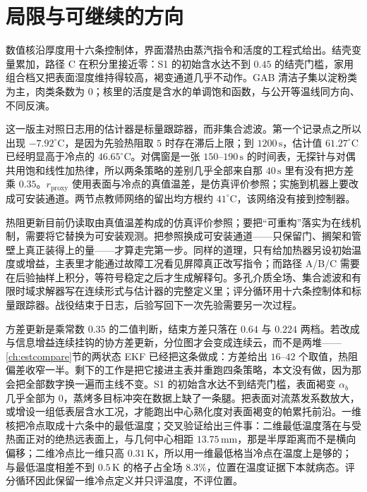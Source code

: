 \section{局限与可继续的方向}

数值核沿厚度用十六条控制体，界面潜热由蒸汽指令和活度的工程式给出。结壳变量累加，路径 C 在积分里接近零：S1 的初始含水达不到 \(0.45\) 的结壳门槛，家用组合档又把表面湿度维持得较高，褐变通道几乎不动作。GAB 清洁子集以淀粉类为主，肉类条数为 \(0\)；核里的活度是含水的单调饱和函数，与公开等温线同方向、不同反演。

这一版主对照日志用的估计器是标量跟踪器，而非集合滤波。第一个记录点之所以出现 \(-7.92^\circ\mathrm{C}\)，是因为先验热阻取 \(5\) 时存在滞后上限；到 \(1200\,\mathrm{s}\)，估计值 \(61.27^\circ\mathrm{C}\) 已经明显高于冷点的 \(46.65^\circ\mathrm{C}\)。对偶窗是一张 \(150\)--\(190\,\mathrm{s}\) 的时间表，无探针与对偶共用饱和线性加热律，所以两条策略的差别几乎全部来自那 \(40\,\mathrm{s}\) 里有没有把方差乘 \(0.35\)。\(r_{\mathrm{proxy}}\) 使用表面与冷点的真值温差，是仿真评价参照；实施到机器上要改成可安装通道。两节点教师网络的留出均方根约 \(41^\circ\mathrm{C}\)，该网络没有接到控制器。

热阻更新目前仍读取由真值温差构成的仿真评价参照；要把“可重构”落实为在线机制，需要将它替换为可安装观测。把参照换成可安装通道——只保留门、搁架和管壁上真正装得上的量——才算走完第一步。同样的道理，只有给加热器另设初始温度或增益，主表里才能通过故障工况看见屏障真正改写指令；而路径 A/B/C 需要在后验抽样上积分，等符号稳定之后才生成解释句。多孔介质全场、集合滤波和有限时域求解器写在连续形式与估计器的完整定义里；评分循环用十六条控制体和标量跟踪器。战役结束于日志，后验写回下一次先验需要另一次过程。

方差更新是乘常数 \(0.35\) 的二值判断，结束方差只落在 \(0.64\) 与 \(0.224\) 两档。若改成与信息增益连续挂钩的协方差更新，分位图才会变成连续云，而不是两堆——\ref{ch:estcompare}{}节的两状态 EKF 已经把这条做成：方差给出 \(16\)--\(42\) 个取值，热阻偏差收窄一半。剩下的工作是把它接进主表并重跑四条策略，本文没有做，因为那会把全部数字换一遍而主线不变。S1 的初始含水达不到结壳门槛，表面褐变 \(\alpha_b\) 几乎全部为 \(0\)，蒸烤多目标冲突在数据上缺了一条腿。把表面对流蒸发系数放大，或增设一组低表层含水工况，才能跑出中心熟化度对表面褐变的帕累托前沿。一维核把冷点取成十六条中的最低温度；交叉验证给出三件事：二维最低温度落在与受热面正对的绝热远表面上，与几何中心相距 \(13.75\,\mathrm{mm}\)，那是半厚距离而不是横向偏移；二维冷点比一维只高 \(0.31\,\mathrm{K}\)，所以用一维最低格当冷点在温度上是够的；与最低温度相差不到 \(0.5\,\mathrm{K}\) 的格子占全场 \(8.3\%\)，位置在温度证据下本就病态。评分循环因此保留一维冷点定义并只评温度，不评位置。


